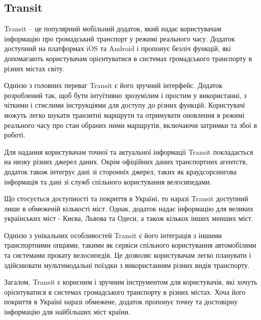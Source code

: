 \subsection{Transit}
\label{subsec:transit-subsection}

Transit -- це популярний мобільний додаток, який надає користувачам інформацію про громадський транспорт у режимі реального часу. Додаток доступний на платформах iOS та Android і пропонує безліч функцій, які допомагають користувачам орієнтуватися в системах громадського транспорту в різних містах світу.

Однією з головних переваг Transit є його зручний інтерфейс. Додаток розроблений так, щоб бути інтуїтивно зрозумілим і простим у використанні, з чіткими і стислими інструкціями для доступу до різних функцій. Користувачі можуть легко шукати транзитні маршрути та отримувати оновлення в режимі реального часу про стан обраних ними маршрутів, включаючи затримки та збої в роботі.

Для надання користувачам точної та актуальної інформації Transit покладається на низку різних джерел даних. Окрім офіційних даних транспортних агентств, додаток також інтегрує дані зі сторонніх джерел, таких як краудсорсингова інформація та дані зі служб спільного користування велосипедами.

Що стосується доступності та покриття в Україні, то наразі Transit доступний лише в обмеженій кількості міст. Однак, додаток надає інформацію для великих українських міст - Києва, Львова та Одеси, а також кількох інших менших міст.

Однією з унікальних особливостей Transit є його інтеграція з іншими транспортними опціями, такими як сервіси спільного користування автомобілями та системами прокату велосипедів. Це дозволяє користувачам легко планувати і здійснювати мультимодальні поїздки з використанням різних видів транспорту.

Загалом, Transit є корисним і зручним інструментом для користувачів, які хочуть орієнтуватися в системах громадського транспорту в різних містах. Хоча його покриття в Україні наразі обмежене, додаток пропонує точну та достовірну інформацію для найбільших міст країни.
